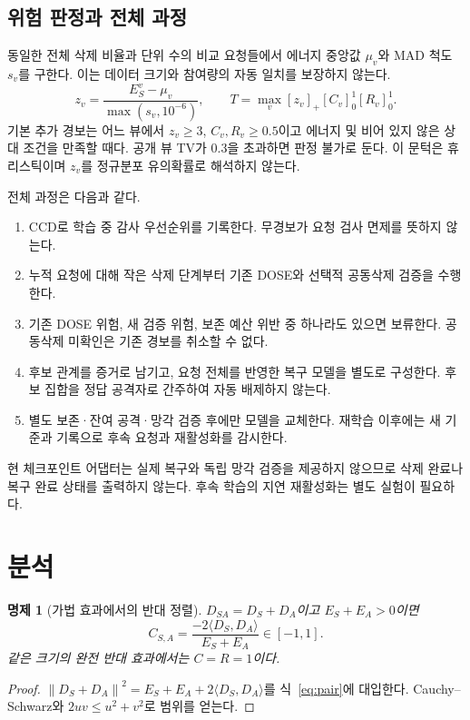 \documentclass[10pt,a4paper]{article}
\newtheorem{proposition}{명제}
\newcommand{\norm}[1]{\left\lVert#1\right\rVert}
\begin{document}
\subsection{위험 판정과 전체 과정}
동일한 전체 삭제 비율과 단위 수의 비교 요청들에서 에너지 중앙값 $\mu_v$와 MAD 척도 $s_v$를 구한다.
이는 데이터 크기와 참여량의 자동 일치를 보장하지 않는다.
\begin{equation}
 z_v=\frac{E_S^v-\mu_v}{\max(s_v,10^{-6})},\qquad
 T=\max_v [z_v]_+[C_v]_0^1[R_v]_0^1.
\end{equation}
기본 추가 경보는 어느 뷰에서 $z_v\ge3$, $C_v,R_v\ge0.5$이고
에너지 및 비어 있지 않은 상대 조건을 만족할 때다. 공개 뷰 TV가 0.3을 초과하면 판정 불가로 둔다.
이 문턱은 휴리스틱이며 $z_v$를 정규분포 유의확률로 해석하지 않는다.

전체 과정은 다음과 같다.
\begin{enumerate}
\item CCD로 학습 중 감사 우선순위를 기록한다. 무경보가 요청 검사 면제를 뜻하지 않는다.
\item 누적 요청에 대해 작은 삭제 단계부터 기존 DOSE와 선택적 공동삭제 검증을 수행한다.
\item 기존 DOSE 위험, 새 검증 위험, 보존 예산 위반 중 하나라도 있으면 보류한다.
      공동삭제 미확인은 기존 경보를 취소할 수 없다.
\item 후보 관계를 증거로 남기고, 요청 전체를 반영한 복구 모델을 별도로 구성한다.
      후보 집합을 정답 공격자로 간주하여 자동 배제하지 않는다.
\item 별도 보존·잔여 공격·망각 검증 후에만 모델을 교체한다.
      재학습 이후에는 새 기준과 기록으로 후속 요청과 재활성화를 감시한다.
\end{enumerate}
현 체크포인트 어댑터는 실제 복구와 독립 망각 검증을 제공하지 않으므로
삭제 완료나 복구 완료 상태를 출력하지 않는다.
후속 학습의 지연 재활성화는 별도 실험이 필요하다.

\section{분석}
\begin{proposition}[가법 효과에서의 반대 정렬]
$D_{SA}=D_S+D_A$이고 $E_S+E_A>0$이면
\begin{equation}
 C_{S,A}=\frac{-2\langle D_S,D_A\rangle}{E_S+E_A}\in[-1,1].
\end{equation}
같은 크기의 완전 반대 효과에서는 $C=R=1$이다.
\end{proposition}
\begin{proof}
$\norm{D_S+D_A}^2=E_S+E_A+2\langle D_S,D_A\rangle$를 식~\eqref{eq:pair}에 대입한다.
Cauchy--Schwarz와 $2uv\le u^2+v^2$로 범위를 얻는다.
\end{proof}
\end{document}
